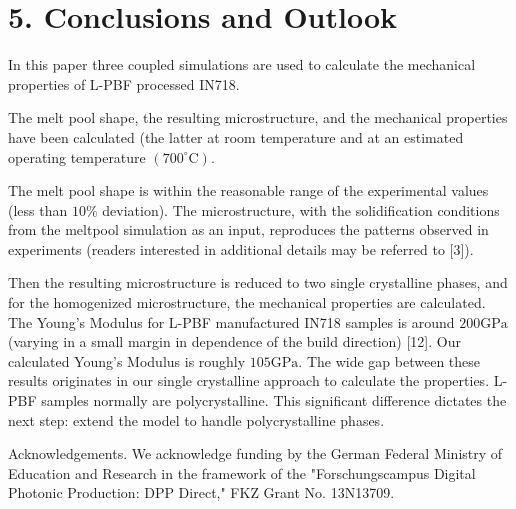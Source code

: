 \documentclass[10pt]{article}
\begin{document}
\section*{5. Conclusions and Outlook}
In this paper three coupled simulations are used to calculate the mechanical properties of L-PBF processed IN718.

The melt pool shape, the resulting microstructure, and the mechanical properties have been calculated (the latter at room temperature and at an estimated operating temperature $\left(700^{\circ} \mathrm{C}\right)$.

The melt pool shape is within the reasonable range of the experimental values (less than $10 \%$ deviation). The microstructure, with the solidification conditions from the meltpool simulation as an input, reproduces the patterns observed in experiments (readers interested in additional details may be referred to [3]).

Then the resulting microstructure is reduced to two single crystalline phases, and for the homogenized microstructure, the mechanical properties are calculated. The Young's Modulus for L-PBF manufactured IN718 samples is around $200 \mathrm{GPa}$ (varying in a small margin in dependence of the build direction) [12]. Our calculated Young's Modulus is roughly $105 \mathrm{GPa}$. The wide gap between these results originates in our single crystalline approach to calculate the properties. L-PBF samples normally are polycrystalline. This significant difference dictates the next step: extend the model to handle polycrystalline phases.

Acknowledgements. We acknowledge funding by the German Federal Ministry of Education and Research in the framework of the "Forschungscampus Digital Photonic Production: DPP Direct," FKZ Grant No. 13N13709.
\end{document}
